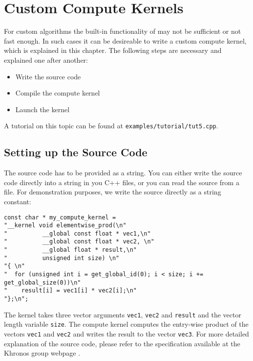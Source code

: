 

\chapter{Custom Compute Kernels} \label{chap:custom}

For custom algorithms the built-in functionality of {\ViennaCL} may not be sufficient or not fast enough. In such cases it can be desireable to write a custom {\OpenCL} compute kernel, which is explained in this chapter. The following steps are necessary and explained one after another:
\begin{itemize}
 \item Write the {\OpenCL} source code
 \item Compile the compute kernel
 \item Launch the kernel
\end{itemize}
A tutorial on this topic can be found at \texttt{examples/tutorial/tut5.cpp}.

\section{Setting up the Source Code}
The {\OpenCL} source code has to be provided as a string. You can either write the source code directly into a string in you C++ files, or you can read the {\OpenCL} source from a file. For demonstration purposes, we write the source directly as a string constant:
\begin{lstlisting}
const char * my_compute_kernel = 
"__kernel void elementwise_prod(\n"
"          __global const float * vec1,\n"
"          __global const float * vec2, \n"
"          __global float * result,\n"
"          unsigned int size) \n"
"{ \n"
"  for (unsigned int i = get_global_id(0); i < size; i += get_global_size(0))\n"
"    result[i] = vec1[i] * vec2[i];\n"
"};\n";
\end{lstlisting}
The kernel takes three vector arguments \lstinline{vec1}, \lstinline{vec2} and \lstinline{result} and the vector length variable \lstinline{size}. The compute kernel computes the entry-wise product of the vectors \lstinline|vec1| and \lstinline|vec2| and writes the result to the vector \lstinline{vec3}. For more detailed explanation of the {\OpenCL} source code, please refer to the specification available at the Khronos group webpage \cite{khronoscl}.

